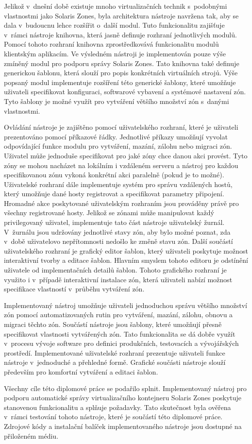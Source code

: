 Jelikož v~dnešní době existuje mnoho virtualizačních technik s~podobnými vlastnostmi jako Solaris Zones, byla architektura nástroje
navržena tak, aby se dala v~budoucnu lehce rozšířit o~další modul. Tuto funkcionalitu zajišťuje v~rámci nástroje knihovna, která
jasně definuje rozhraní jednotlivých modulů. Pomocí tohoto rozhraní knihovna zprostředkovává funkcionalitu modulů klientským 
aplikacím. Ve výsledném nástroji je implementován pouze výše zmíněný modul pro podporu správy Solaris Zones. Tato knihovna také
definuje generickou šablonu, která slouží pro popis konkrétních virtuálních strojů. Výše popsaný modul implementuje rozšíření této
generické šablony, které umožňuje uživateli specifikovat konfiguraci, softwarové vybavení a systémové nastavení zón. Tyto šablony
je možné využít pro vytváření většího množství zón s~danými vlastnostmi.

Ovládání nástroje je zajištěno pomocí uživatelského rozhraní, které je uživateli prezentováno pomocí příkazové řádky. Jednotlivé
příkazy umožňují vyvolat odpovídající funkce modulu pro vytváření, mazání, zálohu nebo migraci zón. Uživatel může jednoduše 
specifikovat pro jaké zóny chce danou akci provést. Tyto zóny se mohou nacházet na lokálním i vzdáleném serveru a nástroj
pro každou specifikovanou zónu vykoná konkrétní akci paralelně (pokud je to možné). Uživatelské rozhraní dále implementuje 
systém pro správu vzdálených hostů, který umožňuje dané hosty registrovat a specifikovat parametry připojení. Hromadné akce
poskytované uživatelským rozhraním jsou prováděny právě pro všechny registrované hosty. Jelikož se zónami může manipulovat každý
privilegovaný uživatel, implementuje tato část nástroje uživatelský žurnál. V~žurnálu jsou udržovány jednotlivé stavy zón, aby
bylo možné poznat, zda v~době uživatelovo nepřítomnosti nedošlo ke změně stavu zón. Další součástí uživatelského rozhraní je
grafický editor šablon, který uživateli poskytuje možnost interaktivní tvorby a editace šablon. Hlavním smyslem tohoto editoru
je odstínění uživatele od implementačních detailů šablon. Tohoto grafického rozhraní je využito i v~případě interaktivní instalace
zón, která uživateli nabízí možnost specifikace vlastností v~průběhu vytváření zón. 

Implementovaný nástroj umožňuje uživateli jednoduchou správu většího množství zón pomocí automatizovaných rutin pro vytváření,
mazání, zálohu, obnovu a migraci těchto zón. Součástí nástroje jsou šablony, které umožňují přesně specifikovat vlastnosti 
vytvářených zón. Tato funkcionalita se dá dobře využít v~procesu vývoje software pro definici produkčních, testovacích a 
vývojářských prostředí. Implementované uživatelské rozhraní prezentuje uživateli funkce nástroje v~jednoduché a přehledné formě.
Grafické součásti nástroje slouží především pro komfortní vytváření a editaci šablon.

Všechny cíle této diplomové práce se podařilo splnit. Implementovaný nástroj pro podporu automatické správy virtualizačního
kontejneru Solaris Zones poskytuje stanovenou funkcionalitu a splňuje požadavky. Tato skutečnost byla ověřena v~rámci testování
tohoto nástroje, které je součástí této diplomové práce. Zdrojové kódy a instalační balíček implementovaného nástroje jsou dostupné
na přiloženém médiu.
